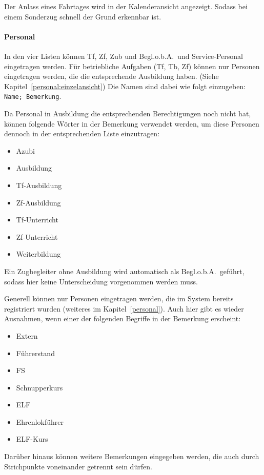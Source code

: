 Der Anlass eines Fahrtages wird in der Kalenderansicht angezeigt.
Sodass bei einem Sonderzug schnell der Grund erkennbar ist.

\paragraph{Personal}
In den vier Listen können Tf, Zf, Zub und Begl.o.b.A.\ und Service-Personal eingetragen werden.
Für betriebliche Aufgaben (Tf, Tb, Zf) können nur Personen eingetragen werden, die die entsprechende Ausbildung haben.
(Siehe Kapitel~\ref{personal:einzelansicht})
Die Namen sind dabei wie folgt einzugeben: \texttt{Name; Bemerkung}.

Da Personal in Ausbildung die entsprechenden Berechtigungen noch nicht hat, können folgende Wörter in der Bemerkung verwendet werden, um diese Personen dennoch in der entsprechenden Liste einzutragen:
\begin{itemize}
	\item Azubi
	\item Ausbildung
	\item Tf-Ausbildung
	\item Zf-Ausbildung
	\item Tf-Unterricht
	\item Zf-Unterricht
	\item Weiterbildung
\end{itemize}
Ein Zugbegleiter ohne Ausbildung wird automatisch als Begl.o.b.A.\ geführt, sodass hier keine Unterscheidung vorgenommen werden muss.

Generell können nur Personen eingetragen werden, die im System bereits registriert wurden
(weiteres im Kapitel~\ref{personal}).
Auch hier gibt es wieder Ausnahmen, wenn einer der folgenden Begriffe in der Bemerkung erscheint:
\begin{itemize}
	\item Extern
	\item Führerstand
	\item FS
	\item Schnupperkurs
	\item ELF
	\item Ehrenlokführer
	\item ELF-Kurs
\end{itemize}
Darüber hinaus können weitere Bemerkungen eingegeben werden, die auch durch Strichpunkte voneinander getrennt sein dürfen.




